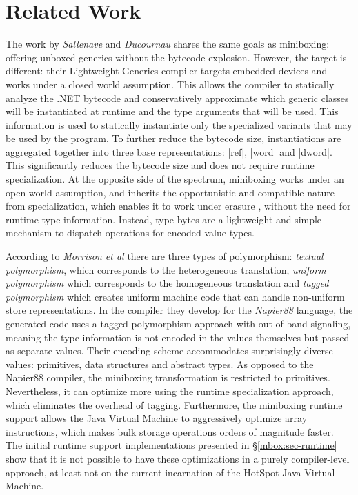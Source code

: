 \section{Related Work}
\label{mbox:sec-related}

The work by {\em Sallenave} and {\em Ducournau} \cite{lightweight-generics} shares the same goals as miniboxing: offering unboxed generics without the bytecode explosion. However, the target is different: their Lightweight Generics compiler targets embedded devices and works under a closed world assumption. This allows the compiler to statically analyze the .NET bytecode and conservatively approximate which generic classes will be instantiated at runtime and the type arguments that will be used. This information is used to statically instantiate only the specialized variants that may be used by the program. To further reduce the bytecode size, instantiations are aggregated together into three base representations: |ref|, |word| and |dword|. This significantly reduces the bytecode size and does not require runtime specialization. At the opposite side of the spectrum, miniboxing works under an open-world assumption, and inherits the opportunistic and compatible nature from specialization, which enables it to work under erasure \cite{java-erasure}, without the need for runtime type information. Instead, type bytes are a lightweight and simple mechanism to dispatch operations for encoded value types.

According to {\em Morrison et al} \cite{morrison-napier88} there are three types of polymorphism: {\em textual polymorphism}, which corresponds to the heterogeneous translation, {\em uniform polymorphism} which corresponds to the homogeneous translation and {\em tagged polymorphism} which creates uniform machine code that can handle non-uniform store representations. In the compiler they develop for the {\em Napier88} language, the generated code uses a tagged polymorphism approach with out-of-band signaling, meaning the type information is not encoded in the values themselves but passed as separate values. Their encoding scheme accommodates surprisingly diverse values: primitives, data structures and abstract types. As opposed to the Napier88 compiler, the miniboxing transformation is restricted to primitives. Nevertheless, it can optimize more using the runtime specialization approach, which eliminates the overhead of tagging. Furthermore, the miniboxing runtime support allows the Java Virtual Machine to aggressively optimize array instructions, which makes bulk storage operations orders of magnitude faster. The initial runtime support implementations presented in \S\ref{mbox:sec-runtime} show that it is not possible to have these optimizations in a purely compiler-level approach, at least not on the current incarnation of the HotSpot Java Virtual Machine.    


